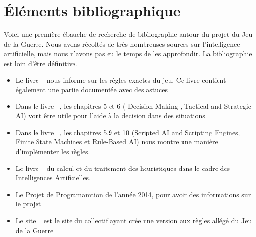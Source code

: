   \section{Éléments bibliographique}

   Voici une première ébauche de recherche de bibliographie autour du projet du Jeu de la Guerre.
    Nous avons récoltés de très nombreuses sources sur l'intelligence artificielle, mais nous n'avons
    pas eu le temps de les approfondir. La bibliographie est loin d'être définitive.
    \begin{itemize}

	  \item Le livre ~\cite{ref5} nous informe sur les règles exactes du jeu. Ce livre contient également une partie documentée avec des astuces
    \item Dans le livre ~\cite{ref1}, les chapitres 5 et 6 ( Decision Making , Tactical and Strategic AI) vont être utile pour l'aide à la decision dans des situations
    \item Dans le livre ~\cite{ref2}, les chapitres 5,9 et 10 (Scripted AI and Scripting Engines, Finite State Machines et Rule-Based AI) nous montre une manière d'implémenter les règles.
	  \item Le livre ~\cite{ref4} du calcul et du traitement des heuristiques dans le cadre des Intelligences Artificielles.
    \item Le Projet de Programamtion de l'année 2014, pour avoir des informations sur le projet 
    \item Le site ~\cite{ref6} est le site du collectif ayant crée une version aux règles allégé du Jeu de la Guerre
    

      
    \end{itemize}

